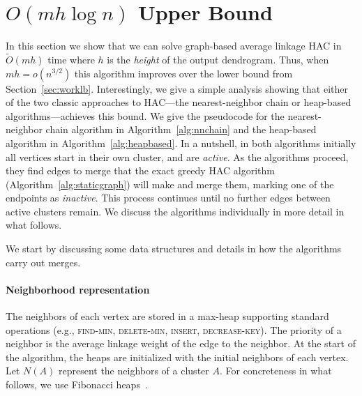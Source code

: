 


\section{\texorpdfstring{\boldmath$O(mh\log n)$}{O(mhlogn)} Upper Bound}\label{sec:workupperbound}


In this section we show that we can solve graph-based average linkage HAC in $\tilde{O}(mh)$ time where $h$ is the {\em height} of the output dendrogram.
Thus, when $mh = o(n^{3/2})$ this algorithm improves over the lower bound from Section~\ref{sec:worklb}.
Interestingly, we give a simple analysis showing that either of the two classic approaches to HAC---the nearest-neighbor chain or heap-based algorithms---achieves this bound.
We give the pseudocode for the nearest-neighbor chain algorithm in Algorithm~\ref{alg:nnchain} and the heap-based algorithm in Algorithm~\ref{alg:heapbased}.
In a nutshell, in both algorithms initially all vertices start in their own cluster, and are {\emph{active}}.
As the algorithms proceed, they find edges to merge that the exact greedy HAC algorithm (Algorithm~\ref{alg:staticgraph}) will make and merge them, marking one of the endpoints as {\em inactive}.
This process continues until no further edges between active clusters remain.
We discuss the algorithms individually in more detail in what follows.

We start by discussing some data structures and details in how the algorithms carry out merges.

\paragraph{Neighborhood representation}
The neighbors of each vertex are stored in a max-heap supporting standard operations (e.g., \textsc{find-min}, \textsc{delete-min}, \textsc{insert}, \textsc{decrease-key}).
The priority of a neighbor is the average linkage weight of the edge to the neighbor.
At the start of the algorithm, the heaps are initialized with the initial neighbors of each vertex.
Let $N(A)$ represent the neighbors of a cluster $A$.
For concreteness in what follows, we use Fibonacci heaps~\cite{CLRS, fredman1987fibonacci}.


